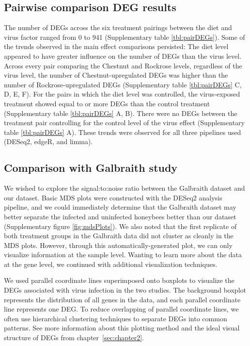 \documentclass[11pt,a4paper,oldfontcommands,openany]{memoir}
\numberwithin{equation}{section} %
\begin{document}
\subsection{Pairwise comparison DEG results}

The number of DEGs across the six treatment pairings between the diet and virus factor ranged from 0 to 941 (Supplementary table \ref{tbl:pairDEGs}). Some of the trends observed in the main effect comparisons persisted: The diet level appeared to have greater influence on the number of DEGs than the virus level. Across every pair comparing the Chestnut and Rockrose levels, regardless of the virus level, the number of Chestnut-upregulated DEGs was higher than the number of Rockrose-upregulated DEGs (Supplementary table \ref{tbl:pairDEGs} C, D, E, F). For the pairs in which the diet level was controlled, the virus-exposed treatment showed equal to or more DEGs than the control treatment (Supplementary table \ref{tbl:pairDEGs} A, B). There were no DEGs between the treatment pair controlling for the control level of the virus effect (Supplementary table \ref{tbl:pairDEGs} A). These trends were observed for all three pipelines used (DESeq2, edgeR, and limma). 

\subsection{Comparison with Galbraith study}

We wished to explore the signal:to:noise ratio between the Galbraith dataset and our dataset. Basic MDS plots were constructed with the DESeq2 analysis pipeline, and we could immediately determine that the Galbraith dataset may better separate the infected and uninfected honeybees better than our dataset (Supplementary figure \ref{fig:mdsPlots}). We also noted that the first replicate of both treatment groups in the Galbraith data did not cluster as cleanly in the MDS plots. However, through this automatically-generated plot, we can only visualize information at the sample level. Wanting to learn more about the data at the gene level, we continued with additional visualization techniques.

We used parallel coordinate lines superimposed onto boxplots to visualize the DEGs associated with virus infection in the two studies. The background boxplot represents the distribution of all genes in the data, and each parallel coordinate line represents one DEG. To reduce overlapping of parallel coordinate lines, we often use hierarchical clustering techniques to separate DEGs into common patterns. See more information about this plotting method and the ideal visual structure of DEGs from chapter~\ref{sec:chapter2}.
\end{document}
